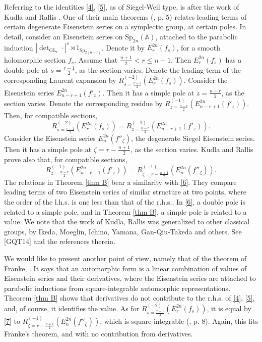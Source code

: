 \documentclass[12pts]{amsart}
\newcommand{\BA}{{\mathbb {A}}}
\newcommand{\GL}{{\mathrm{GL}}}
\newcommand{\Sp}{{\mathrm{Sp}}}
\begin{document}
Referring to the identities \eqref{4}, \eqref{5}, as of Siegel-Weil type, is after the work of Kudla and Rallis \cite{KR94}. One of their main theorems (\cite{KR94}, p. 5) relates leading terms of certain degenerate Eisenstein series on a symplectic group, at certain poles. In detail, consider an Eisenstein series on $\Sp_{2n}(\BA)$, attached to the parabolic induction $|\det_{\GL_r}\cdot|^s\rtimes 1_{\Sp_{2(n-r)}}$. Denote it by $E_r^{2n}(f_s)$, 
for a smooth holomorphic section $f_s$. Assume that $\frac{n+1}{2}<r\leq n+1$. Then $E_r^{2n}(f_s)$ has a double pole at $s=\frac{r-1}{2}$, as the section varies. Denote the leading term of the corresponding Laurent expansion by $R^{(-2)}_{s=\frac{r-1}{2}}(E_r^{2n}(f_s))$. Consider the Eisenstein series $E_{n-r+1}^{2n}(f'_z)$. Then it has a simple pole at $z=\frac{n-r}{2}$, as the section varies. Denote the corresponding residue by $R^{(-1)}_{z=\frac{n-r}{2}}(E_{n-r+1}^{2n}(f'_z))$. Then, for compatible sections,
\begin{equation}\label{6}
R^{(-2)}_{s=\frac{r-1}{2}}(E_r^{2n}(f_s))=R^{(-1)}_{z=\frac{n-r}{2}}(E_{n-r+1}^{2n}(f'_z)).
\end{equation}
Consider the Eisenstein series $E_n^{2n}(f''_\zeta)$, the degenerate Siegel Eisenstein series. Then it has a simple pole at $\zeta=r-\frac{n+1}{2}$, as the section varies. Kudla and Rallis prove also that, for compatible sections,
\begin{equation}\label{7}
R^{(-1)}_{z=\frac{n-r}{2}}(E_{n-r+1}^{2n}(f'_z))=R^{(-1)}_{\zeta=r-\frac{n+1}{2}}(E_n^{2n}(f''_\zeta)).
\end{equation}
The relations in Theorem \ref{thm B} bear a similarity with \eqref{6}. They compare leading terms of two Eisenstein series of similar structure at two points, where the order of the l.h.s. is one less than that of the r.h.s.. In \eqref{6}, a double pole is related to a simple pole, and in Theorem \ref{thm B}, a simple pole is related to a value. We note that the work of Kudla, Rallis was generalized to other classical groups, by Ikeda, Moeglin, Ichino, Yamana, Gan-Qiu-Takeda and others. See [GQT14] and the references therein.

We would like to present another point of view, namely that of the theorem of Franke, \cite{F98}. It says that an automorphic form is a linear combination of values of Eisenstein series and their derivatives, where the Eisenstein series are attached to parabolic inductions from square-integrable automorphic representations. Theorem \ref{thm B} shows that derivatives do not contribute to the r.h.s. of \eqref{4}, \eqref{5}, and, of course, it identifies the value. As for $R^{(-2)}_{s=\frac{r-1}{2}}(E_r^{2n}(f_s))$, it is equal by \eqref{7} to $R^{(-1)}_{\zeta=r-\frac{n+1}{2}}(E_n^{2n}(f''_\zeta))$, which is square-integrable (\cite{KR94}, p. 8). Again, this fits Franke's theorem, and with no contribution from derivatives.
\end{document}
